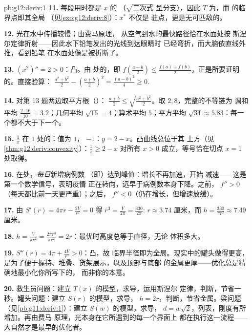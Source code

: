 \begin{solution}{pb:g12:deriv:1}
\textbf{11.} 每段用时都是 $x$ 的
（$\sqrt{\text{二次式}}$ 型分支），因此 $T$ 为，而
的临界点即其全局
（见\cref{exo:g12:deriv:8}）：$x^*$ 不仅是
驻点，更是无可匹敌的。

\textbf{12.} 光在水中传播较慢；由费马原理，
从空气到水的最快路径恰在水面处按
斯涅尔定律折射——因此水下铅笔发出的光线到达眼睛时
已经弯折，而大脑依直线外推，看到铅笔
在水面处像是被折断了。

\textbf{13.} $(x^2)'' = 2 > 0$：凸。由
处的，即 $f\left(\frac{a+b}{2}\right) \leq
\frac{f(a) + f(b)}{2}$，正是所要证明的。直接验算：
$\frac{a^2 + b^2}{2} - \left(\frac{a+b}{2}\right)^2 =
\frac{(a - b)^2}{4} \geq 0$.

\textbf{14.} 对第 13 题两边取平方根（）：
$\frac{a + b}{2} \leq \sqrt{\frac{a^2 + b^2}{2}}$。取 $2, 8$，完整的不等链为
调和平均 $\frac{2 \cdot 16}{10} = 3.2$；几何平均
$\sqrt{16} = 4$；算术平均 $5$；平方平均
$\sqrt{34} \approx 5.83$：每一个都不大于下一个。

\textbf{15.} $\frac1x$ 在 $1$ 处的：值为 $1$，
$-1$：$y = 2 - x$。凸曲线总位于其
上方（见\cref{thm:g12:deriv:convexity}）：$\frac1x \geq 2 - x$ 对所有
$x > 0$ 成立，等号恰在切点 $x = 1$ 处取得。

\textbf{16.} 在处，\emph{每日}新增病例数
（即）达到峰值：增长不再加速，开始
减速——这是第一个数学信号，表明疫情
正在转向，远早于病例数本身下降。之前，
$f'' > 0$（每天都比前一天更严重）；之后，
$f'' < 0$（仍在增长，但增速放缓）。

\textbf{17.} 由 $S'(r) = 4\pi r - \frac{2V}{r^2} = 0$ 得
$r^3 = \frac{V}{2\pi} = \frac{330}{2\pi}$:
$r \approx 3.74$ 厘米，而
$h = \frac{330}{\pi r^2} \approx 7.49$ 厘米。

\textbf{18.} $h = \frac{V}{\pi r^2} = \frac{2\pi r^3}{\pi r^2}
= 2r$：最优时高度总等于直径，无论
体积多大。

\textbf{19.} $S''(r) = 4\pi + \frac{4V}{r^3} > 0$：凸，故
临界半径即为全局。现实中的罐头做得更高，
是为了便于握持、堆叠、货架展示，以及顶部与底部
的金属更厚——优化总是精确地最小化你所写下的，
而非你的本意。

\textbf{20.} 救生员问题：建立 $T(x)$ 的模型，求导，运用斯涅尔
定律，判断，节省一秒。罐头问题：建立 $S(r)$ 的模型，求导，
$h = 2r$，判断，节省金属。梁问题
（见\cref{pb:g11:deriv:1}）：建立 $S(w)$ 的模型，求导，
$d = w\sqrt2$，列表，刚度有所增加。再由费马
原理，光本身在它所遇到的每一个界面上
都在执行这一流程——大自然才是最早的优化者。
\end{solution}
